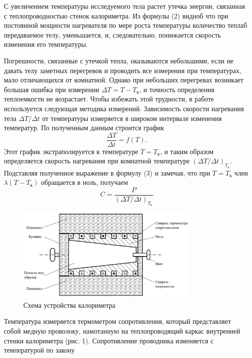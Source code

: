 \documentclass[a4paper, 12pt]{article}
\begin{document}
    С увеличением температуры исследуемого тела растет утечка энергии, связанная с теплопроводностью стенок калориметра. Из формулы (2) видноб что при постоянной мощности нагревателя по мере роста температуры количество теплаб передаваемое телу, уменьшается, и, следовательно, понижается скорость изменения его температуры.

    Погрешности, связанные с утечкой тепла, оказываются небольшими, если не давать телу заметных перегревов и проводить все измерения при температурах, мало отличающихся от комнатной. Однако при небольших перегревах возникает большая ошибка при измерении $\Delta T = T - T_\text{к}$, и точность определения теплоемкости не возрастает. Чтобы избежать этой трудности, в работе используется следующая методика измерений. Зависимость скорости нагревания тела $\Delta T / \Delta t$ от температуры измеряется в широком интервале изменения температур. По полученным данным строится график
    \begin{equation*}
        \frac{\Delta T}{\Delta t} = f(T).
    \end{equation*}
    Этот график экстраполируется к температуре $T = T_{\text{к}}$, и таким образом определяется скорость нагревания при комнатной температуре $(\Delta T / \Delta t)_{T_{\text{к}}}$. Подставляя полученное выражение в формулу (3) и замечая, что при $T = T_{\text{к}}$ член $\lambda(T - T_{\text{к}})$ обращается в ноль, получаем
    \begin{equation}
        C = \frac{P}{(\Delta T / \Delta t)_{T_{\text{к}}}}
        \label{4}
    \end{equation}


    \begin{figure}[h]
        \centering
        \includegraphics[width=0.8\textwidth]{img/calorimeter.png}
        \caption{Схема устройства калориметра}
        \label{fig:calorimeter}
    \end{figure}

    Температура измеряется термометром сопротивления, который представляет собой медную проволоку, намотанную на теплопроводящий каркас внутренней стенки калориметра (рис. 1). Сопротивление проводника изменяется с температурой по закону
\end{document}
